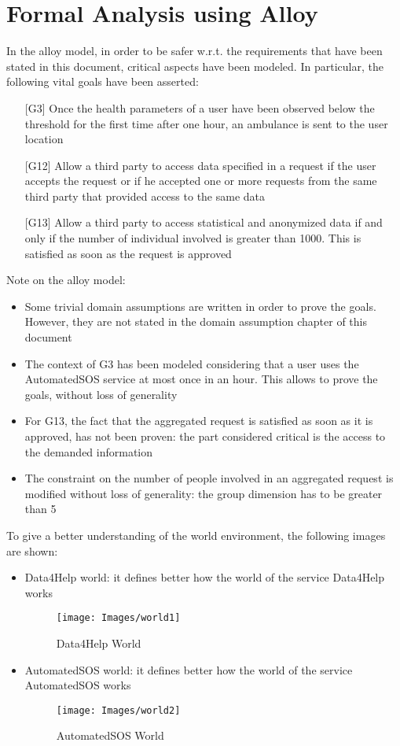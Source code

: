 \section{Formal Analysis using Alloy}
In the alloy model, in order to be safer w.r.t. the requirements that have been stated in this document, critical aspects have been modeled. 
In particular, the following vital goals have been asserted:
\begin{enumerate}
\item[{[G3]}] Once the health parameters of a user have been observed below the threshold for the first time after one hour, an ambulance is sent to the user location
\item[{[G12]}]  Allow a third party to access data specified in a request if the user accepts the request or if he accepted one or more requests from the same third party that provided access to the same data 
\item[{[G13]}] Allow a third party to access statistical and anonymized data if and only if the number of individual involved is greater than 1000. This is satisfied as soon as the request is approved  
\end{enumerate}

Note on the alloy model: 
\begin{itemize}
\item Some trivial domain assumptions are written in order to prove the goals. 
However, they are not stated in the domain assumption chapter of this document 
\item The context of G3 has been modeled considering that a user uses the AutomatedSOS service at most once in an hour. 
This allows to prove the goals, without loss of generality 
\item For G13, the fact that the aggregated request is satisfied as soon as it is approved, has not been proven: the part considered critical is the access to the demanded information 
\item The constraint on the number of people involved in an aggregated request is modified without loss of generality: the group dimension has to be greater than 5 
\end{itemize}



To give a better understanding of the world environment, the following images are shown:
\begin{itemize}
\item Data4Help world: it defines better how the world of the service Data4Help works
\begin{figure}[H]
\texttt{[image: Images/world1]}
\caption{ Data4Help World }
\label{fig:world1}
\end{figure}

\item AutomatedSOS world: it defines better how the world of the service AutomatedSOS works
\begin{figure}[H]
\texttt{[image: Images/world2]}
\caption{ AutomatedSOS World }
\label{fig:world2}
\end{figure}
 

\end{itemize}
